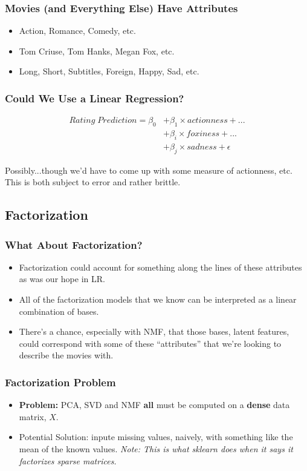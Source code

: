 \documentclass{beamer}
\begin{document}
\begin{frame}
  \frametitle{Movies (and Everything Else) Have Attributes}
  \begin{itemize}
    \item Action, Romance, Comedy, etc.
    \item Tom Criuse, Tom Hanks, Megan Fox, etc.
    \item Long, Short, Subtitles, Foreign, Happy, Sad, etc.
  \end{itemize}
\end{frame}

\begin{frame}
  \frametitle{Could We Use a Linear Regression?}
  \begin{align*}
    Rating\; Prediction = \beta_0 &+ \beta_1 \times actionness + ... \\
    &+ \beta_i \times foxiness + ... \\
    &+ \beta_j \times sadness + \epsilon
  \end{align*} \vspace{4mm} \pause

  Possibly...though we'd have to come up with some measure of actionness, etc. This is both subject to error and rather brittle.
\end{frame}

\subsection{Factorization}
\begin{frame}
  \frametitle{What About Factorization?}
  \begin{itemize}
    \item Factorization could account for something along the lines of these attributes as was our hope in LR. \vspace{2mm}
    \item All of the factorization models that we know can be interpreted as a linear combination of bases. \vspace{2mm}
    \item There's a chance, especially with NMF, that those bases, latent features, could correspond with some of these ``attributes'' that we're looking to describe the movies with.
  \end{itemize}
\end{frame}

\begin{frame}
  \frametitle{Factorization Problem}
  \begin{itemize}
    \item \textbf{Problem:} PCA, SVD and NMF \textbf{all} must be computed on a \textbf{dense} data matrix, $X$. \vspace{2mm}
    \item Potential Solution: inpute missing values, naively, with something like the mean of the known values. \textit{Note: This is what sklearn does when it says it factorizes sparse matrices.}
  \end{itemize}
\end{frame}
\end{document}
